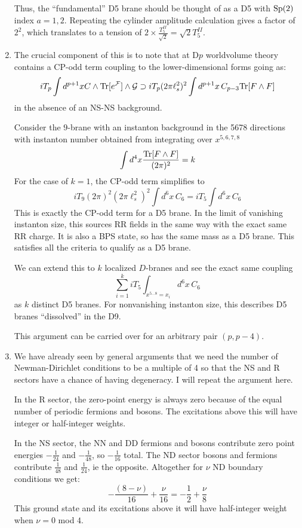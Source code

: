 \documentclass[11pt, class=article, crop=false]{standalone}
\begin{document}
\begin{enumerate}
	Thus, the ``fundamental'' D5 brane should be thought of as a D5 with $\mathrm{Sp}(2)$ index $a=1,2$. Repeating the cylinder amplitude calculation gives a factor of $2^2$, which translates to a tension of $2 \times \frac{T_5^{II}}{\sqrt2} = \sqrt2 T_5^{II}$.
	
	
	\item The crucial component of this is to note that at D$p$ worldvolume theory contains a CP-odd term coupling to the lower-dimensional forms going as:
	\[
		i T_p \int d^{p+1} x C \wedge \mathrm{Tr} [e^{\mathcal F}] \wedge \mathcal G \supset i T_p (2\pi \ell_s^2)^2 \int d^{p+1} x\,  C_{p-3}  \mathrm{Tr}[F \wedge F]
	\]
	in the absence of an NS-NS background. 
	
	Consider the $9$-brane with an instanton background in the 5678 directions with instanton number obtained from integrating over $x^{5,6,7,8}$
	\[
		 \int d^4 x \frac{\mathrm{Tr}[F \wedge F]}{(2\pi)^2} = k
	\]
	For the case of $k=1$, the CP-odd term simplifies to
	\[
		i T_9 (2 \pi)^2 (2 \pi \ell_s^2)^2  \int d^{6} x\, C_{6} = i T_{5} \int d^{6} x \,  C_{6} 
	\] 
	This is exactly the CP-odd term for a D5 brane. In the limit of vanishing instanton size, this sources RR fields in the same way with the exact same RR charge. It is also a BPS state, so has the same mass as a D5 brane. This satisfies all the criteria to qualify as a D5 brane. 
	
	We can extend this to $k$ localized $D$-branes and see the exact same coupling
	\[
		\sum_{i=1}^k i T_5 \int_{x^{5 \dots 8} = x_i} d^6 x\, C_6
	\]
	as $k$ distinct D5 branes. For nonvanishing instanton size, this describes D5 branes ``dissolved'' in the D9.
	
	This argument can be carried over for an arbitrary pair $(p, p-4)$. 
	
	\item We have already seen by general arguments that we need the number of Newman-Dirichlet conditions to be a multiple of 4 so that the NS and R sectors have a chance of having degeneracy. I will repeat the argument here. 
	
	In the R sector, the zero-point energy is always zero because of the equal number of periodic fermions and bosons. The excitations above this will have integer or half-integer weights. 
	
	In the NS sector, the NN and DD fermions and bosons contribute zero point energies $-\frac{1}{24}$ and $-\frac{1}{48}$, so $-\frac{1}{16}$ total. The ND sector bosons and fermions contribute $\frac{1}{48}$ and $\frac{1}{24}$, ie the opposite. Altogether for $\nu$ ND boundary conditions we get:
	\[
		- \frac{(8 - \nu)}{16} + \frac{\nu}{16} = - \frac12 + \frac{\nu}{8}
	\]
	This ground state and its excitations above it will have half-integer weight when $\nu = 0$ mod $4$.
	

\end{enumerate}
\end{document}
